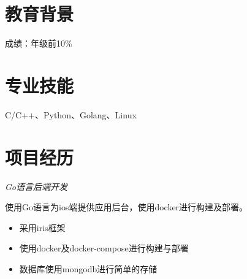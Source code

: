 \documentclass{uniquecv}
\begin{document}
\medskip



\section{教育背景}
成绩：年级前10\% %



\section{专业技能}
\smallskip
C/C++、Python、Golang、Linux





\section{项目经历}


\textit{Go语言后端开发}
\vspace{0.4ex}

使用Go语言为ios端提供应用后台，使用docker进行构建及部署。

\begin{itemize}
  \item 采用iris框架
  \item 使用docker及docker-compose进行构建与部署
  \item 数据库使用mongodb进行简单的存储
\end{itemize}
\end{document}
